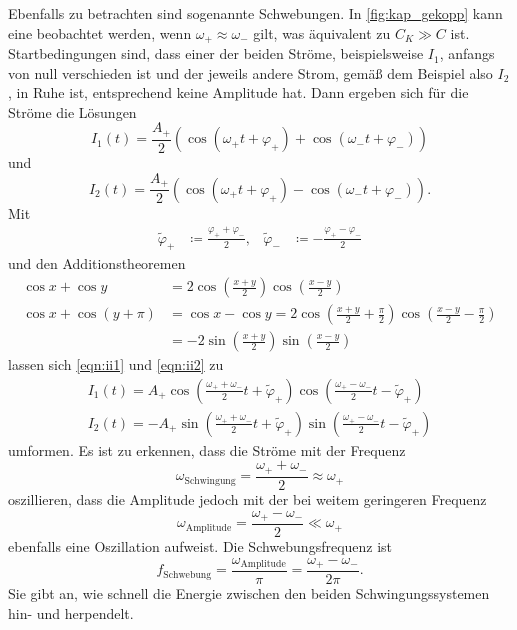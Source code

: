 Ebenfalls zu betrachten sind sogenannte Schwebungen. 
In \ref{fig:kap_gekopp} kann eine beobachtet werden, wenn ${\omega _+ \approx \omega _-}$ gilt, was äquivalent zu 
${C_K \gg C}$ ist. 
Startbedingungen sind, dass einer der beiden Ströme, beispielsweise $I_1$, anfangs von null verschieden ist und der 
jeweils andere Strom, gemäß dem Beispiel also $I_2$, in Ruhe ist, entsprechend keine Amplitude hat. 
Dann ergeben sich für die Ströme die Lösungen 
\begin{equation}
    I_1 (t) = \frac{A_+}{2} ( \cos(\omega _+ t + \varphi _+) + \cos(\omega _- t + \varphi _-))
    \label{eqn:ii1}
\end{equation}
und 
\begin{equation}
    I_2 (t) = \frac{A_+}{2} ( \cos(\omega _+ t + \varphi _+) - \cos(\omega _- t + \varphi _-)) .
    \label{eqn:ii2}
\end{equation}
Mit 
\begin{align}
    \tilde{\varphi}_+ &\coloneq \frac{\varphi _+ + \varphi _-}{2} ,
    & \tilde{\varphi}_- &\coloneq - \frac{\varphi _+ - \varphi _-}{2}
\end{align}
und den Additionstheoremen 
\begin{align}
    \cos x + \cos y &= 2 \cos(\frac{x+y}{2}) \cos(\frac{x-y}{2}) \\
    \cos x + \cos(y + \pi) &= \cos x - \cos y = 2 \cos(\frac{x+y}{2} + \frac{\pi}{2}) \cos(\frac{x-y}{2} - \frac{\pi}{2}) \\
        &=-2  \sin(\frac{x+y}{2}) \sin(\frac{x-y}{2})
\end{align}
lassen sich \ref{eqn:ii1} und \ref{eqn:ii2} zu 
\begin{gather}
    I_1 (t)= A_+ \cos(\frac{\omega _+ + \omega _-}{2}t +\tilde{\varphi}_+) \cos(\frac{\omega _+ - \omega _-}{2}t -\tilde{\varphi}_+) \\
    I_2 (t)=-A_+ \sin(\frac{\omega _+ + \omega _-}{2}t +\tilde{\varphi}_+) \sin(\frac{\omega _+ - \omega _-}{2}t -\tilde{\varphi}_+)
\end{gather}
umformen.
Es ist zu erkennen, dass die Ströme mit der Frequenz 
\begin{equation}
    \omega _\text{Schwingung} = \frac{\omega _+ + \omega _-}{2} \approx \omega _+
\end{equation}
oszillieren, dass die Amplitude jedoch mit der bei weitem geringeren Frequenz 
\begin{equation}
    \omega _\text{Amplitude} = \frac{\omega _+ - \omega _-}{2} \ll \omega _+
\end{equation} 
ebenfalls eine Oszillation aufweist. 
Die Schwebungsfrequenz ist 
\begin{equation}
    f_\text{Schwebung}= \frac{\omega _\text{Amplitude}}{\pi}=\frac{\omega _+ - \omega _-}{2 \pi}.
\end{equation} 
Sie gibt an, wie schnell die Energie zwischen den beiden Schwingungssystemen hin- und herpendelt. 

